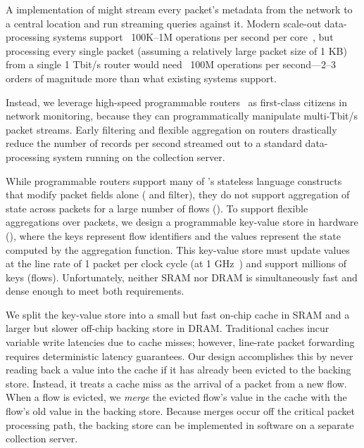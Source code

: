 A \naive implementation of \TheSystem might stream every packet's
metadata from the network to a central location and run streaming queries
against it. Modern scale-out data-processing systems support ~100K--1M
operations per second per core~\cite{kafka_benchmark, redis_benchmark,
memcached_benchmark, redis_vs_memcached_update,
spark-streaming}, but processing every single packet (assuming a relatively
large packet size of 1 KB) from a single 1 Tbit/s router would need ~100M
operations per second---2--3 orders of magnitude more than what existing systems
support.

Instead, we leverage high-speed programmable routers~\cite{rmt, xpliant,
tofino, flexpipe} as first-class citizens in network monitoring, because they
can programmatically manipulate multi-Tbit/s packet streams.  Early filtering
and flexible aggregation on routers drastically reduce the number of records per
second streamed out to a standard data-processing system running on
the collection server.

While programmable routers support many of \TheSystem's stateless
language constructs that modify packet fields alone ( and {\ct
filter}), they do not support aggregation of state across packets for a large
number of flows (). To support flexible aggregations over
packets, we design a
programmable key-value store in hardware (), where the keys
represent flow identifiers and the values represent the state computed by the
aggregation function. This key-value store must
update values at the line rate of 1 packet per clock cycle (at 1
GHz~\cite{rmt, xpliant_sdk}) and support millions of keys (\ie flows).
Unfortunately, neither SRAM nor DRAM is simultaneously fast and dense
enough to meet both requirements.

We split the key-value store into a small but fast on-chip cache in SRAM and a
larger but slower off-chip backing store in DRAM. Traditional caches incur
variable write latencies due to cache misses; however, line-rate packet
forwarding requires deterministic latency guarantees. Our design accomplishes
this by never reading back a value into the cache if it has already been
evicted to the backing store. Instead, it treats a cache miss as the arrival of
a packet from a new flow. When a flow is evicted, we {\em merge} the evicted flow's value in the cache with the flow's
old value in the backing store. Because merges occur off the
critical packet processing path, the backing store can be implemented in
software on a separate collection server.%

